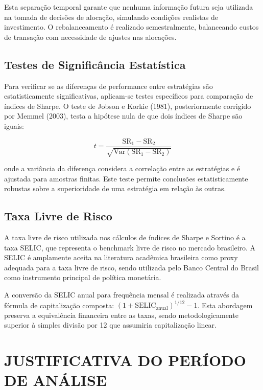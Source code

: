 Esta separação temporal garante que nenhuma informação futura seja utilizada na tomada de decisões de alocação, simulando condições realistas de investimento. O rebalanceamento é realizado semestralmente, balanceando custos de transação com necessidade de ajustes nas alocações.

\subsection{Testes de Significância Estatística}

Para verificar se as diferenças de performance entre estratégias são estatisticamente significativas, aplicam-se testes específicos para comparação de índices de Sharpe. O teste de Jobson e Korkie (1981), posteriormente corrigido por Memmel (2003), testa a hipótese nula de que dois índices de Sharpe são iguais:

\begin{equation}
t = \frac{\text{SR}_1 - \text{SR}_2}{\sqrt{\text{Var}(\text{SR}_1 - \text{SR}_2)}}
\end{equation}

onde a variância da diferença considera a correlação entre as estratégias e é ajustada para amostras finitas. Este teste permite conclusões estatisticamente robustas sobre a superioridade de uma estratégia em relação às outras.

\subsection{Taxa Livre de Risco}

A taxa livre de risco utilizada nos cálculos de índices de Sharpe e Sortino é a taxa SELIC, que representa o benchmark livre de risco no mercado brasileiro. A SELIC é amplamente aceita na literatura acadêmica brasileira como proxy adequada para a taxa livre de risco, sendo utilizada pelo Banco Central do Brasil como instrumento principal de política monetária.

A conversão da SELIC anual para frequência mensal é realizada através da fórmula de capitalização composta: $(1 + \text{SELIC}_{\text{anual}})^{1/12} - 1$. Esta abordagem preserva a equivalência financeira entre as taxas, sendo metodologicamente superior à simples divisão por 12 que assumiria capitalização linear.

\section{JUSTIFICATIVA DO PERÍODO DE ANÁLISE}

